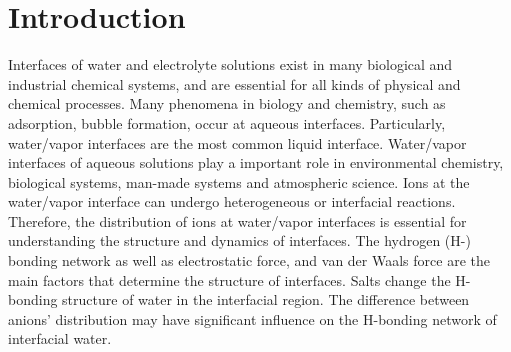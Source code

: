 \chapter{Introduction}\label{CHAPETR_1}
Interfaces of water and electrolyte solutions exist in many biological and industrial chemical systems, and
are essential for all kinds of physical \cite{Yamamoto2008, Salmeron2009,Balajka2018} and chemical processes. \cite{Tobias99,Benderskii00,Benderskii02}
Many phenomena in biology and chemistry, such as adsorption,
bubble formation, occur at aqueous interfaces. \cite{Ball2008}
Particularly, water/vapor interfaces are the most common liquid interface. \cite{Kuo2004b} 
Water/vapor interfaces of aqueous solutions play a important role in environmental chemistry, biological systems, \cite{ZhangLY09,Nostro12} 
man-made systems \cite{Richmond02,LiuH04,Asahi01} and atmospheric science. \cite{TianCS08,Irwin88} 
Ions at the water/vapor interface can undergo heterogeneous or interfacial reactions. \cite{HuJH95,LiuDF04,Clifford07,Manna13,Pillar2014}
Therefore, the distribution of ions at water/vapor interfaces is essential for understanding the structure and dynamics of interfaces. 
The hydrogen (H-) bonding network \cite{Eisenberg1969,Speedy1976,Poole1994,Soper2008b,Nilsson2011,Ball2001,Pettersson2015} as well as electrostatic force, and van der Waals force are the main factors that determine the structure of interfaces. 
Salts change the H-bonding structure of water in the interfacial region. \cite{EAR04,McLain2006,Ball2008} 
The difference between anions' distribution may have significant influence on the H-bonding network of interfacial water. \cite{Morita2008}


